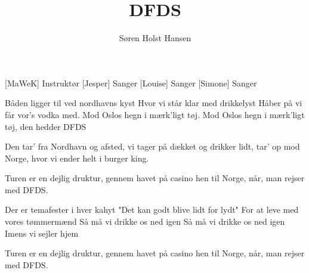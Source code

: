 \documentclass[a4paper,11pt]{article}
\title{DFDS}
\author{Søren Holst Hansen}
\begin{document}
\maketitle

\begin{roles}
[MaWeK] Instruktør
[Jesper] Sanger
[Louise] Sanger
[Simone] Sanger
\end{roles}

\begin{song}
Båden ligger til ved nordhavns kyst
Hvor vi står klar med drikkelyst
Håber på vi får vor’s vodka med.
Mod Oslos hegn i mærk’ligt tøj.
Mod Oslos hegn i mærk’ligt tøj,
den hedder DFDS

Den tar’ fra Nordhavn og afsted,
vi tager på dækket og drikker lidt,
tar’ op mod Norge,
hvor vi ender helt i burger king.

Turen er en dejlig druktur, gennem havet på casino hen til Norge, når, man rejser med DFDS.

Der er temafester i hver kahyt
"Det kan godt blive lidt for lydt"
For at leve med vores tømmermænd
Så må vi drikke os ned igen
Så må vi drikke os ned igen
Imens vi sejler hjem

Turen er en dejlig druktur, gennem havet på casino hen til Norge, når, man rejser med DFDS.
\end{song}
\end{document}
